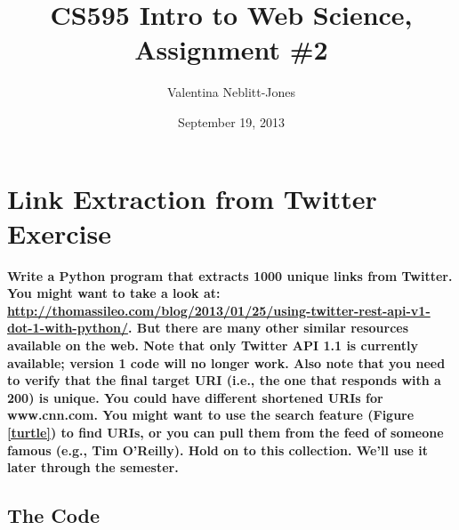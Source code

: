 \documentclass{article}
\begin{document}
\title{CS595 Intro to Web Science, Assignment \#2}
\author{Valentina Neblitt-Jones}
\date{September 19, 2013}
\maketitle

\section{Link Extraction from Twitter Exercise}
\textbf {Write a Python program that extracts 1000 unique links from Twitter. You might want to take a look at: \url{http://thomassileo.com/blog/2013/01/25/using-twitter-rest-api-v1-dot-1-with-python/}. But there are many other similar resources available on the web. Note that only Twitter API 1.1 is currently available; version 1 code will no longer work. Also note that you need to verify that the final target URI (i.e., the one that responds with a 200) is unique. You could have different shortened URIs for www.cnn.com. You might want to use the search feature (Figure \ref{turtle}) to find URIs, or you can pull them from the feed of someone famous (e.g., Tim O'Reilly). Hold on to this collection. We'll use it later through the semester.}


\subsection*{The Code}
\end{document}
